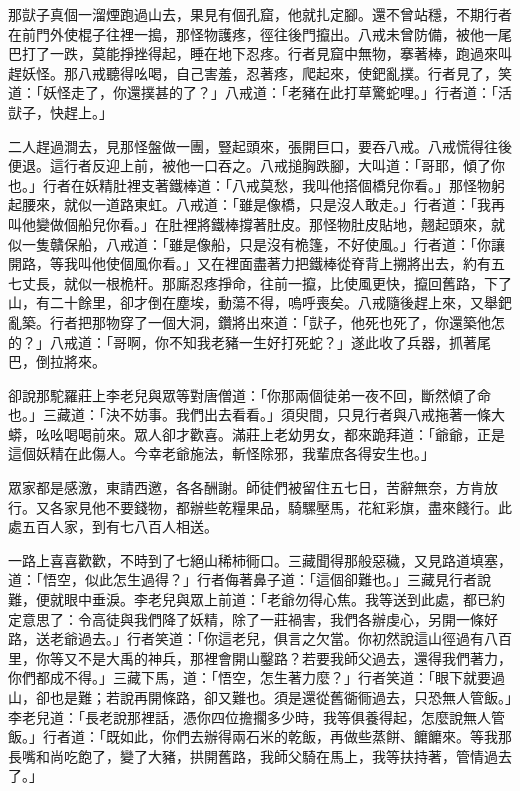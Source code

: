 那獃子真個一溜煙跑過山去，果見有個孔窟，他就扎定腳。還不曾站穩，不期行者在前門外使棍子往裡一搗，那怪物護疼，徑往後門攛出。八戒未曾防備，被他一尾巴打了一跌，莫能掙挫得起，睡在地下忍疼。行者見窟中無物，搴著棒，跑過來叫趕妖怪。那八戒聽得吆喝，自己害羞，忍著疼，爬起來，使鈀亂撲。行者見了，笑道：「妖怪走了，你還撲甚的了？」八戒道：「老豬在此打草驚蛇哩。」行者道：「活獃子，快趕上。」

二人趕過澗去，見那怪盤做一團，豎起頭來，張開巨口，要吞八戒。八戒慌得往後便退。這行者反迎上前，被他一口吞之。八戒搥胸跌腳，大叫道：「哥耶，傾了你也。」行者在妖精肚裡支著鐵棒道：「八戒莫愁，我叫他搭個橋兒你看。」那怪物躬起腰來，就似一道路東虹。八戒道：「雖是像橋，只是沒人敢走。」行者道：「我再叫他變做個船兒你看。」在肚裡將鐵棒撐著肚皮。那怪物肚皮貼地，翹起頭來，就似一隻贛保船，八戒道：「雖是像船，只是沒有桅篷，不好使風。」行者道：「你讓開路，等我叫他使個風你看。」又在裡面盡著力把鐵棒從脊背上搠將出去，約有五七丈長，就似一根桅杆。那廝忍疼掙命，往前一攛，比使風更快，攛回舊路，下了山，有二十餘里，卻才倒在塵埃，動蕩不得，嗚呼喪矣。八戒隨後趕上來，又舉鈀亂築。行者把那物穿了一個大洞，鑽將出來道：「獃子，他死也死了，你還築他怎的？」八戒道：「哥啊，你不知我老豬一生好打死蛇？」遂此收了兵器，抓著尾巴，倒拉將來。

卻說那駝羅莊上李老兒與眾等對唐僧道：「你那兩個徒弟一夜不回，斷然傾了命也。」三藏道：「決不妨事。我們出去看看。」須臾間，只見行者與八戒拖著一條大蟒，吆吆喝喝前來。眾人卻才歡喜。滿莊上老幼男女，都來跪拜道：「爺爺，正是這個妖精在此傷人。今幸老爺施法，斬怪除邪，我輩庶各得安生也。」

眾家都是感激，東請西邀，各各酬謝。師徒們被留住五七日，苦辭無奈，方肯放行。又各家見他不要錢物，都辦些乾糧果品，騎騾壓馬，花紅彩旗，盡來餞行。此處五百人家，到有七八百人相送。

一路上喜喜歡歡，不時到了七絕山稀柿衕口。三藏聞得那般惡穢，又見路道填塞，道：「悟空，似此怎生過得？」行者侮著鼻子道：「這個卻難也。」三藏見行者說難，便就眼中垂淚。李老兒與眾上前道：「老爺勿得心焦。我等送到此處，都已約定意思了：令高徒與我們降了妖精，除了一莊禍害，我們各辦虔心，另開一條好路，送老爺過去。」行者笑道：「你這老兒，俱言之欠當。你初然說這山徑過有八百里，你等又不是大禹的神兵，那裡會開山鑿路？若要我師父過去，還得我們著力，你們都成不得。」三藏下馬，道：「悟空，怎生著力麼？」行者笑道：「眼下就要過山，卻也是難；若說再開條路，卻又難也。須是還從舊衚衕過去，只恐無人管飯。」李老兒道：「長老說那裡話，憑你四位擔擱多少時，我等俱養得起，怎麼說無人管飯。」行者道：「既如此，你們去辦得兩石米的乾飯，再做些蒸餅、饝饝來。等我那長嘴和尚吃飽了，變了大豬，拱開舊路，我師父騎在馬上，我等扶持著，管情過去了。」

